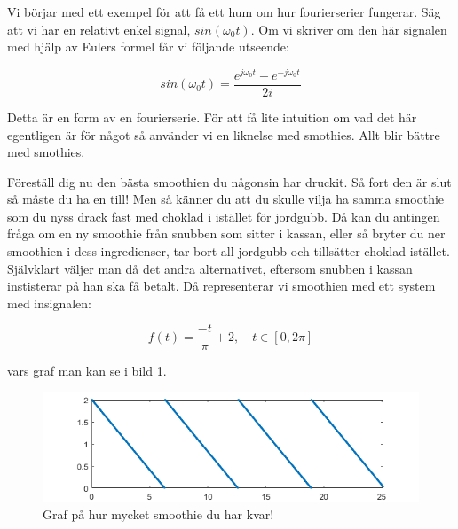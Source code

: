 \documentclass{article}
\begin{document}
Vi börjar med ett exempel för att få ett hum om hur fourierserier fungerar.
 Säg att vi har en relativt enkel signal, $sin(\omega_0 t)$.
Om vi skriver om den här signalen med hjälp av Eulers formel får vi följande utseende:

\begin{displaymath}
  sin(\omega_0 t) = \frac{e^{j \omega_0 t}  - e^{-j \omega_0 t}}{2i}
\end{displaymath}

Detta är en form av en fourierserie.
För att få lite intuition om vad det här egentligen är för något så
använder vi en liknelse med smothies. Allt blir bättre med smothies.

Föreställ dig nu den bästa smoothien du någonsin har druckit. Så fort den är
slut så måste du ha en till! Men så känner du att du skulle vilja ha samma
smoothie som du nyss drack fast med choklad i istället för jordgubb.
Då kan du antingen fråga om en ny smoothie från snubben som sitter i kassan,
eller så bryter du ner smoothien i dess ingredienser, tar bort all jordgubb
och tillsätter choklad istället. Självklart väljer man då det andra alternativet,
eftersom snubben i kassan instisterar på han ska få betalt.
Då representerar vi smoothien med ett system med insignalen:

\begin{displaymath}
  f(t) = \frac{-t}{\pi} + 2, \quad t \in [0,2 \pi]
\end{displaymath}

vars graf man kan se i bild \ref{fig:smoothie}.

\begin{figure}[ht]
\centerline{\includegraphics[scale=0.55]{smoothie.png}}
\caption{Graf på hur mycket smoothie du har kvar!}
\label{fig:smoothie}
\end{figure}
\end{document}
